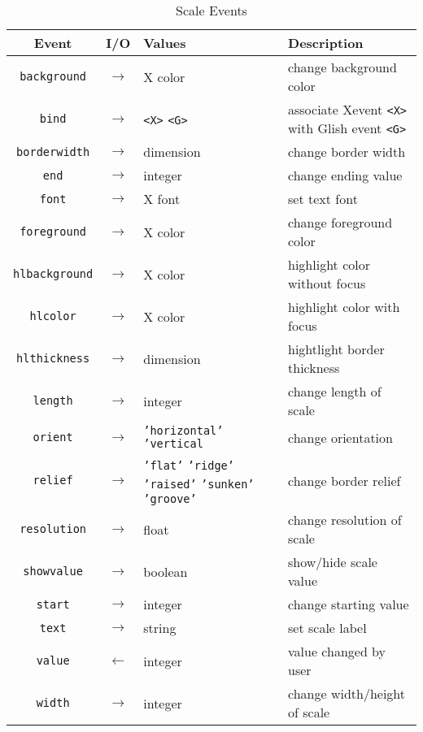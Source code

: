 \begin{table}[tbh]
{\small
\begin{center}
\begin{tabular}{|c|c|p{1.6in}|p{1.6in}|}
\hline
Event & I/O & Values & Description \\
\hline
\hline
{\tt background}&$\rightarrow$& X color & change background color \\ \hline
{\tt bind}	&$\rightarrow$&\verb+<X>+ \verb+<G>+& associate Xevent \verb+<X>+ with Glish event \verb+<G>+ \\ \hline
{\tt borderwidth}&$\rightarrow$& dimension & change border width \\ \hline
{\tt end}	&$\rightarrow$& integer & change ending value \\ \hline
{\tt font}	&$\rightarrow$& X font & set text font \\ \hline
{\tt foreground}&$\rightarrow$& X color & change foreground color \\ \hline
{\tt hlbackground}&$\rightarrow$& X color & highlight color without focus \\ \hline
{\tt hlcolor}	&$\rightarrow$& X color & highlight color with focus \\ \hline
{\tt hlthickness}&$\rightarrow$& dimension & hightlight border thickness \\ \hline
{\tt length}	&$\rightarrow$& integer & change length of scale \\ \hline
{\tt orient}	&$\rightarrow$& {\tt 'horizontal'} {\tt 'vertical} & change orientation \\ \hline
{\tt relief}	&$\rightarrow$& {\tt 'flat'} {\tt 'ridge'} {\tt 'raised'} {\tt 'sunken'} {\tt 'groove'} & change border relief \\ \hline
{\tt resolution} &$\rightarrow$& float & change resolution of scale \\ \hline
{\tt showvalue}	&$\rightarrow$& boolean & show/hide scale value \\ \hline
{\tt start}	&$\rightarrow$& integer & change starting value \\ \hline
{\tt text}	&$\rightarrow$& string & set scale label \\ \hline
{\tt value}	&$\leftarrow$& integer & value changed by user \\ \hline
{\tt width}	&$\rightarrow$& integer & change width/height of scale \\ \hline
\end{tabular}
\end{center}
}
\caption{ Scale Events }
\label{tkscale-events}
\end{table}

